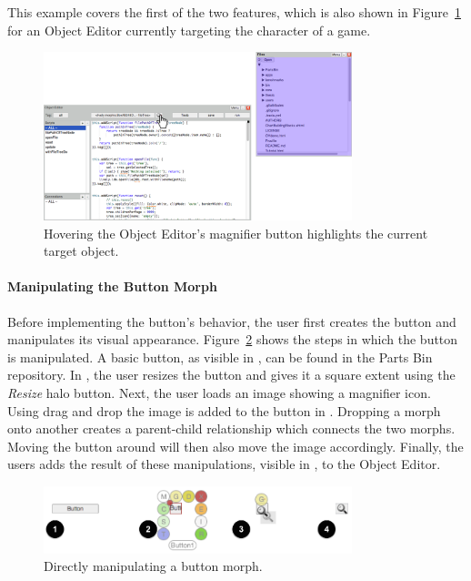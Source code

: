 This example covers the first of the two features, which is also shown in Figure~\ref{fig:MagnifierBehavior} for an Object Editor currently targeting the character of a game.

\begin{figure}[h]
    \centering
    \includegraphics[width=0.8\textwidth]{figures/3_motivation/2_magnifierBehavior.png}
    \caption{Hovering the Object Editor's magnifier button highlights the current target object.}
    \label{fig:MagnifierBehavior}
\end{figure}

\paragraph{Manipulating the Button Morph}
Before implementing the button's behavior, the user first creates the button and manipulates its visual appearance.
Figure~\ref{fig:ButtonBuilding} shows the steps in which the button is manipulated.
A basic button, as visible in , can be found in the Parts Bin repository.
In , the user resizes the button and gives it a square extent using the \emph{Resize} halo button.
Next, the user loads an image showing a magnifier icon.
Using drag and drop the image is added to the button in .
Dropping a morph onto another creates a parent-child relationship which connects the two morphs.
Moving the button around will then also move the image accordingly.
Finally, the users adds the result of these manipulations, visible in , to the Object Editor.

\begin{figure}[h]
    \centering
    \includegraphics[width=0.8\textwidth]{figures/3_motivation/3_buildingTheButton.png}
    \caption{Directly manipulating a button morph.}
    \label{fig:ButtonBuilding}
\end{figure}

